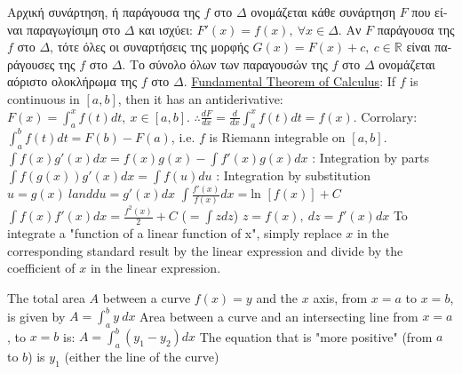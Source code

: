 \documentclass[12pt]{article}
\def\ln{\text{ln\ }} %
\begin{document}
\begin{flushleft}
	\textbullet \quad \textgreek{Αρχική συνάρτηση, ή παράγουσα της} $f$ \textgreek{στο} $\Delta$ \textgreek{ονομάζεται κάθε συνάρτηση} $F$ \textgreek{που είναι παραγωγίσιμη στο} $\Delta$ \textgreek{και ισχύει}: $\displaystyle F'(x) = f(x),\ \forall x\in \Delta$. \linebreak 
	\textbullet \quad \textgreek{Αν} $F$ \textgreek{παράγουσα της} $f$ \textgreek{στο} $\Delta$, \textgreek{τότε όλες οι συναρτήσεις της μορφής} $\displaystyle G(x) = F(x) + c, \ c\in \mathbb{R}$ \textgreek{είναι παράγουσες της} $f$ \textgreek{στο} $\Delta$. \linebreak 
	\textbullet \quad \textgreek{Το σύνολο όλων των παραγουσών της} $f$ \textgreek{στο} $\Delta$ \textgreek{ονομάζεται αόριστο ολοκλήρωμα της} $f$ \textgreek{στο} $\Delta$. \linebreak 
	\textbullet \quad \uline{Fundamental Theorem of Calculus}: If $f$ is continuous in $[a,b]$, then it has an antiderivative: $\displaystyle F(x) = \int_a^x f(t) dt, \ x\in [a,b]$. \linebreak $\displaystyle \therefore \frac{dF}{dx} = \frac{d}{dx} \int_a^x f(t) dt = f(x)$. Corrolary: $\int_a^b f(t) dt = F(b) - F(a)$, i.e. $f$ is Riemann integrable on $[a,b]$. \linebreak 
	\textbullet \quad $\displaystyle \int f(x) g'(x) dx = f(x) g(x) - \int f'(x) g(x) dx$  :  Integration by parts\linebreak 
	\textbullet \quad $\displaystyle \int f(g(x)) g'(x) dx = \int f(u) du$  :  Integration by substitution \linebreak 
	\qquad $\displaystyle u= g(x) \ land du = g'(x) dx$ \linebreak 
	\textbullet \quad $\displaystyle \int \frac{f'(x)}{f(x)} dx = \ln [f(x)] + C $ \linebreak 
	\textbullet \quad  $\displaystyle \int f(x) f'(x) dx = \frac{f^2(x)}{2} + C $ \qquad ($=\int zdz$) \linebreak 
	\qquad $\displaystyle z=f(x), \ dz= f'(x) dx$ \linebreak 
	\textbullet \quad To integrate a "function of a linear function of x", simply replace $x$ in the corresponding standard result by the linear expression and divide by the coefficient of $x$ in the linear expression. \linebreak 
	
	\textbullet \quad The total area $A$ between a curve $f(x) = y$ and the $x$ axis, from $x=a$ to $x=b$, is given by $\displaystyle  A = \int_a^b y \ dx$ \linebreak 
	\textbullet \quad Area between a curve and an intersecting line from $x=a$, to $x=b$ is: $\displaystyle A = \int_a^b (y_1 -y_2) dx $ \linebreak 
	\textbullet \quad The equation that is "more positive" (from $a$ to $b$) is $y_1$ (either the line of the curve) \linebreak 


\end{flushleft}
\end{document}
